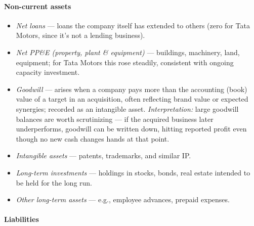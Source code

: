 \documentclass[12pt,openany]{book}
\begin{document}
\paragraph{Non-current assets} 

\begin{itemize}[leftmargin=*]
    \item \emph{Net loans} --- loans the company itself has extended to others (zero for Tata Motors, since it's not a lending business).
    \item \emph{Net PP\&E (property, plant \& equipment)} --- buildings, machinery, land, equipment; for Tata Motors this rose steadily, consistent with ongoing capacity investment.
    \item \emph{Goodwill} --- arises when a company pays more than the accounting (book) value of a target in an acquisition, often reflecting brand value or expected synergies; recorded as an intangible asset. \emph{Interpretation:} large goodwill balances are worth scrutinizing --- if the acquired business later underperforms, goodwill can be written down, hitting reported profit even though no new cash changes hands at that point.
    \item \emph{Intangible assets} --- patents, trademarks, and similar IP.
    \item \emph{Long-term investments} --- holdings in stocks, bonds, real estate intended to be held for the long run.
    \item \emph{Other long-term assets} --- e.g., employee advances, prepaid expenses.
\end{itemize}

\paragraph{Liabilities} 
\end{document}
